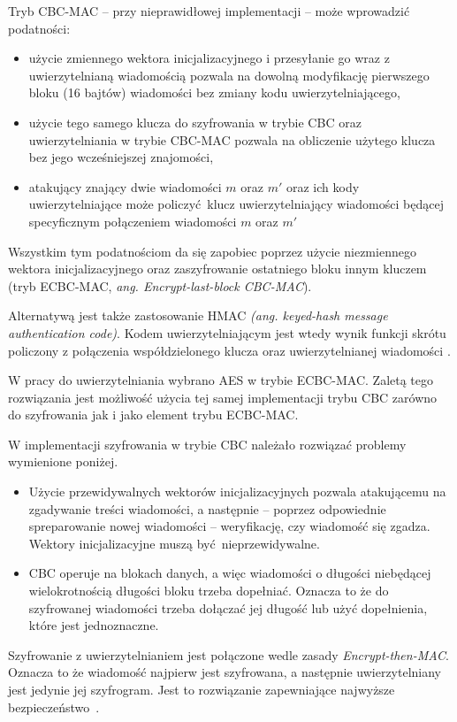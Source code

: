 Tryb CBC-MAC -- przy nieprawidłowej implementacji -- może wprowadzić podatności:

\begin{itemize}
    \item użycie zmiennego wektora inicjalizacyjnego i przesyłanie go wraz z uwierzytelnianą wiadomością pozwala na dowolną modyfikację pierwszego bloku (16 bajtów) wiadomości bez zmiany kodu uwierzytelniającego,
    \item użycie tego samego klucza do szyfrowania w trybie CBC oraz uwierzytelniania w trybie CBC-MAC pozwala na obliczenie użytego klucza bez jego wcześniejszej znajomości,
    \item atakujący znający dwie wiadomości $ m $ oraz $ m' $ oraz ich kody uwierzytelniające może policzyć klucz uwierzytelniający wiadomości będącej specyficznym połączeniem wiadomości $ m $ oraz $ m' $
\end{itemize}

Wszystkim tym podatnościom da się zapobiec poprzez użycie niezmiennego wektora inicjalizacyjnego oraz zaszyfrowanie ostatniego bloku innym kluczem (tryb ECBC-MAC, {\itshape ang. Encrypt-last-block CBC-MAC}).

Alternatywą jest także zastosowanie HMAC {\itshape (ang. keyed-hash message authentication code)}. Kodem uwierzytelniającym jest wtedy wynik funkcji skrótu policzony z połączenia współdzielonego klucza oraz uwierzytelnianej wiadomości \cite{krawczyk1997hmac}.

W pracy do uwierzytelniania wybrano AES w trybie ECBC-MAC. Zaletą tego rozwiązania jest możliwość użycia tej samej implementacji trybu CBC zarówno do szyfrowania jak i jako element trybu ECBC-MAC.

W implementacji szyfrowania w trybie CBC należało rozwiązać problemy wymienione poniżej.

\begin{itemize}
    \item Użycie przewidywalnych wektorów inicjalizacyjnych pozwala atakującemu na zgadywanie treści wiadomości, a następnie -- poprzez odpowiednie spreparowanie nowej wiadomości -- weryfikację, czy wiadomość się zgadza. Wektory inicjalizacyjne muszą być nieprzewidywalne.
    \item CBC operuje na blokach danych, a więc wiadomości o długości niebędącej wielokrotnością długości bloku trzeba dopełniać. Oznacza to że do szyfrowanej wiadomości trzeba dołączać jej długość lub użyć dopełnienia, które jest jednoznaczne.
\end{itemize}

Szyfrowanie z uwierzytelnianiem jest połączone wedle zasady {\itshape Encrypt-then-MAC}. Oznacza to że wiadomość najpierw jest szyfrowana, a następnie uwierzytelniany jest jedynie jej szyfrogram. Jest to rozwiązanie zapewniające najwyższe bezpieczeństwo~\cite{black2011authenticated}.
